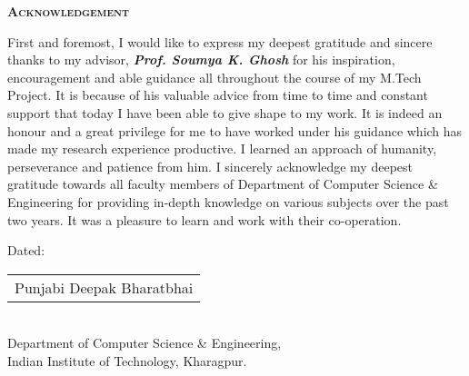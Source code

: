  \vspace*{.5cm}
 \centerline{\LARGE \textsc{\textbf{Acknowledgement}}}
 \vspace*{.5cm}
 \vspace*{1cm}
\hspace*{0.6cm}First and foremost, I would like to express my deepest gratitude and sincere thanks to my advisor, \emph{\textbf{Prof. Soumya K. Ghosh}} for his inspiration, encouragement and able guidance all throughout the course of my M.Tech Project. It is because of his valuable advice from time to time and constant support that today I have been able to give shape to my work. It is indeed an honour and a great privilege for me to have worked under his guidance which has made my research experience productive. I learned an approach of humanity, perseverance and patience from him. 
\vskip 0.1in
\hspace*{0.6cm}I sincerely acknowledge my deepest gratitude towards all faculty members of Department of Computer Science \& Engineering for providing in-depth knowledge on various
subjects over the past two years. It was a pleasure to learn and work with their
co-operation.
\vskip 0.1in
\begin{comment}
\hspace*{0.6cm}Lastly and most importantly, I am grateful to my beloved father \emph{\textbf{Naresh chandra kumar}} and my beloved mother \emph{\textbf{Krishna kumari}} for their unconditional love and constant encouragement which has given me the strength to complete this thesis.
\end{comment}
\vspace*{2cm}
\begin{flushleft}
\vspace{0.5cm} Dated:
\end{flushleft}
\begin{flushright}
\hspace{3cm}
\begin{tabular}{l}
	\tabularnewline 
	\hline Punjabi Deepak Bharatbhai
	\tabularnewline
\end{tabular} \\
\hspace{3cm} Department of Computer Science \& Engineering, \\
\hspace{3cm} Indian Institute of Technology, Kharagpur.\\
\end{flushright}

